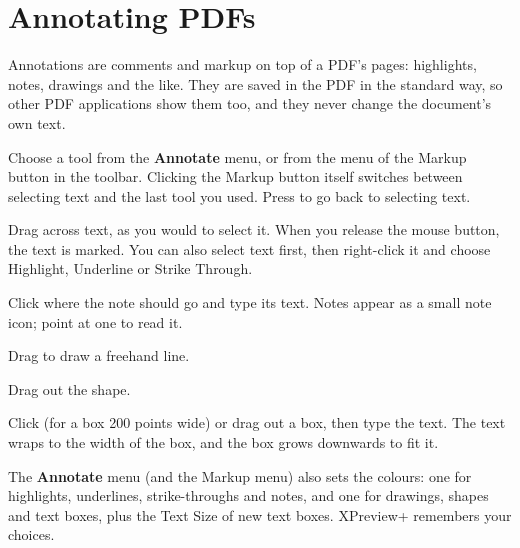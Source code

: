 \documentclass[11pt,a4paper]{article}
\newcommand{\app}{XPreview+}
\newcommand{\key}[1]{{\setlength{\fboxsep}{1.4pt}\setlength{\fboxrule}{0.5pt}%
  \raisebox{-0.1ex}{\fcolorbox{keyframe}{keybg}{\footnotesize\sffamily\strut #1}}}}
\newcommand{\menu}[1]{\textsf{\textbf{#1}}}
\newcommand{\ui}[1]{\textsf{#1}}
\begin{document}
\section{Annotating PDFs}\label{sec:annotate}

Annotations are comments and markup on top of a PDF's pages: highlights, notes, drawings and
the like. They are saved in the PDF in the standard way, so other PDF applications show them
too, and they never change the document's own text.

Choose a tool from the \menu{Annotate} menu, or from the menu of the \ui{Markup} button in the
toolbar. Clicking the \ui{Markup} button itself switches between selecting text and the last
tool you used. Press \key{Esc} to go back to selecting text.

\begin{description}[style=nextline, leftmargin=2.2em, font=\sffamily\bfseries]
  \item[Highlight, Underline, Strike Through] Drag across text, as you would to select it. When
        you release the mouse button, the text is marked. You can also select text first, then
        right-click it and choose \ui{Highlight}, \ui{Underline} or \ui{Strike Through}.
  \item[Note] Click where the note should go and type its text. Notes appear as a small note
        icon; point at one to read it.
  \item[Draw] Drag to draw a freehand line.
  \item[Rectangle, Oval] Drag out the shape.
  \item[Text Box] Click (for a box 200 points wide) or drag out a box, then type the text. The
        text wraps to the width of the box, and the box grows downwards to fit it.
\end{description}

The \menu{Annotate} menu (and the \ui{Markup} menu) also sets the colours: one for
highlights, underlines, strike-throughs and notes, and one for drawings, shapes and text
boxes, plus the \ui{Text Size} of new text boxes. \app{} remembers your choices.
\end{document}
